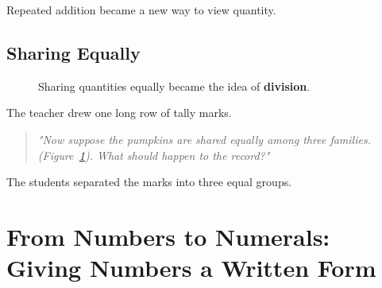 \documentclass[11pt]{article}
\begin{document}
Repeated addition became a new way to view quantity.
\subsection*{Sharing Equally}

\begin{figure}[ht]
\centering


\caption{
Sharing quantities equally became the idea of \textbf{division}.
}

\label{fig:divisiontally}

\end{figure}
The teacher drew one long row of tally marks.
\begin{quote}
\emph{"Now suppose the pumpkins are shared equally among three families. (Figure~\ref{fig:divisiontally}). What should happen to the record?"}
\end{quote}

The students separated the marks into three equal groups.

\section*{\textcolor{numeralplum}{From Numbers to Numerals: Giving Numbers a Written Form}}
\end{document}
